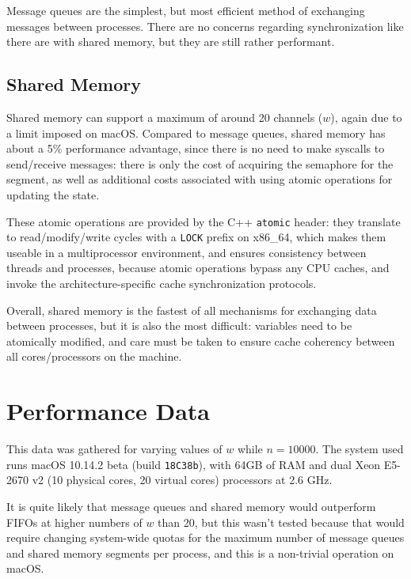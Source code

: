 \documentclass[10pt]{article}
\begin{document}
Message queues are the simplest, but most efficient method of exchanging messages between processes. There are no concerns regarding synchronization like there are with shared memory, but they are still rather performant.

\subsection{Shared Memory}
Shared memory can support a maximum of around 20 channels ($w$), again due to a limit imposed on macOS. Compared to message queues, shared memory has about a 5\% performance advantage, since there is no need to make syscalls to send/receive messages: there is only the cost of acquiring the semaphore for the segment, as well as additional costs associated with using atomic operations for updating the state. 

These atomic operations are provided by the C++ \texttt{atomic} header: they translate to read/modify/write cycles with a \texttt{LOCK} prefix on x86_64, which makes them useable in a multiprocessor environment, and ensures consistency between threads and processes, because atomic operations bypass any CPU caches, and invoke the architecture-specific cache synchronization protocols.

Overall, shared memory is the fastest of all mechanisms for exchanging data between processes, but it is also the most difficult: variables need to be atomically modified, and care must be taken to ensure cache coherency between all cores/processors on the machine.

\section{Performance Data}
This data was gathered for varying values of $w$ while $n = 10000$. The system used runs macOS 10.14.2 beta (build \texttt{18C38b}), with 64GB of RAM and dual Xeon E5-2670 v2 (10 physical cores, 20 virtual cores) processors at 2.6 GHz.

It is quite likely that message queues and shared memory would outperform FIFOs at higher numbers of $w$ than 20, but this wasn't tested because that would require changing system-wide quotas for the maximum number of message queues and shared memory segments per process, and this is a non-trivial operation on macOS.
\end{document}
